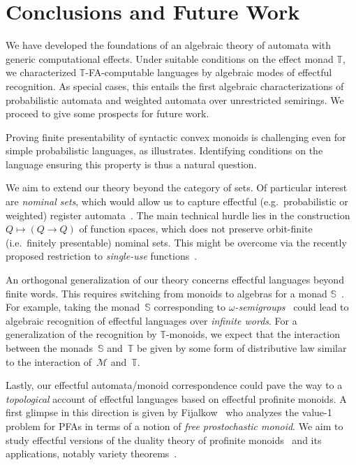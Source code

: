 \documentclass[a4paper, UKenglish, numberwithinsect, thm-restate, cleveref, final]{lipics-v2021}
\theoremstyle{plain}
\theoremstyle{definition}
\newcommand{\T}{\ensuremath{\mathbb{T}}\xspace}
\newcommand{\M}{\ensuremath{\mathcal{M}}\xspace}
\numberwithin{equation}{section}
\begin{document}
\section{Conclusions and Future Work}

We have developed the foundations of an algebraic theory of automata with generic computational
effects. Under suitable conditions on the effect monad \T{}, we characterized
$\T$-FA-computable languages by algebraic modes of effectful recognition. As special cases,
this entails the first algebraic characterizations of probabilistic automata and weighted
automata over unrestricted semirings. We proceed to give some prospects for future work.

Proving finite presentability of syntactic convex monoids is challenging even for simple probabilistic languages, as  illustrates. Identifying conditions on the language ensuring this property is thus a natural question.

We aim to extend our theory beyond the category of sets. Of particular interest are \emph{nominal sets}, which would allow us to capture effectful (e.g.~probabilistic or weighted) register automata~\cite{bkl14}. The main technical hurdle lies in the construction $Q\mapsto (Q\to Q)$ of function spaces, which does not preserve orbit-finite (i.e.~finitely presentable) nominal sets. This might be overcome via the recently proposed restriction to \emph{single-use} functions~\cite{bs20,bns24}.

An orthogonal generalization of our theory concerns effectful languages beyond finite words. This requires switching from monoids to algebras for a monad $\mathbb{S}$~\cite{Bojan15}.
For example, taking the monad~$\mathbb{S}$ corresponding to \emph{\(\omega\)-semigroups}~\cite{pp04} could lead to algebraic recognition of effectful languages over \emph{infinite words}.
For a generalization of the recognition by $\T$-monoids, we expect that the interaction between the monads~$\mathbb{S}$ and~\(\T\) be given by some form of distributive law similar to the interaction of~\(\M\) and~\(\T\).

Lastly, our effectful automata/monoid correspondence could pave the way to a \emph{topological} account of effectful languages based on effectful profinite monoids. A first glimpse in this direction is given by Fijalkow~\cite{fijalkow-17} who analyzes the value-1 problem for PFAs in terms of a notion of \emph{free prostochastic monoid}. We aim to study effectful versions of the duality theory of profinite monoids~\cite{gehrke-13,bum24} and its applications, notably variety theorems~\cite{ggp08,uacm17}.
\end{document}
